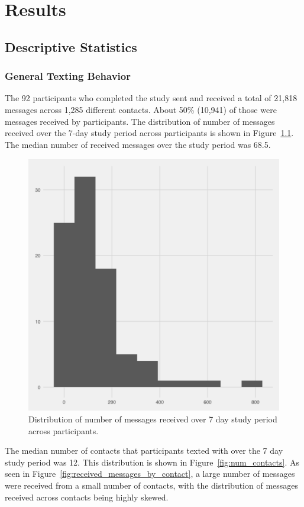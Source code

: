 \documentclass[12pt]{nuthesis}	%
\begin{document}
\chapter{Results}

\section{Descriptive Statistics}

\subsection{General Texting Behavior}
\label{sec:texting}

The 92 participants who completed the study sent and received a total of 21,818 messages across 1,285 different contacts. About 50\% (10,941) of those were messages received by participants. The distribution of number of messages received over the 7-day study period across participants is shown in Figure~\ref{fig:received_messages}. The median number of received messages over the study period was 68.5. 

\begin{figure}[h]
\centering
\includegraphics[width=.7\textwidth]{figures/all_messages_received_distribution}
\caption{Distribution of number of messages received over 7 day study period across participants.}
\label{fig:received_messages}
\end{figure}

The median number of contacts that participants texted with over the 7 day study period was 12. This distribution is shown in Figure~\ref{fig:num_contacts}. As seen in Figure~\ref{fig:received_messages_by_contact}, a large number of messages were received from a small number of contacts, with the distribution of messages received across contacts being highly skewed.
\end{document}

